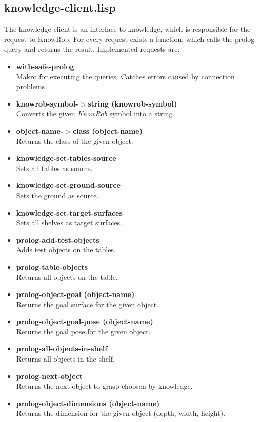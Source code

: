 \documentclass[main.tex]{subfiles}
\begin{document}
		\subsection{knowledge-client.lisp}
		The knowledge-client is an interface to knowledge, which is responsible for the request to KnowRob. For every request exists a function, which calls the prolog-query and returns the result. Implemented requests are:
			\begin{itemize}
			  \item \textbf{with-safe-prolog} \\
			  Makro for executing the queries. Catches errors caused by connection problems.
			  \item \textbf{knowrob-symbol-$>$string (knowrob-symbol)} \\
			  Converts the given \textit{KnowRob} symbol into a string.
			  \item \textbf{object-name-$>$class (object-name)} \\
			  Returns the class of the given object.
				\item \textbf{knowledge-set-tables-source} \\ Sets all tables as source.
				\item \textbf{knowledge-set-ground-source} \\ Sets the ground as source.
				\item \textbf{knowledge-set-target-surfaces} \\ Sets all shelves as target surfaces.
			  \item \textbf{prolog-add-test-objects} \\ Adds test objects on the tables.
				\item \textbf{prolog-table-objects} \\ Returns all objects on the table.
				\item \textbf{prolog-object-goal (object-name)} \\ Returns the goal surface for the given object.
			  \item \textbf{prolog-object-goal-pose (object-name)} \\ Returns the goal pose for the given object.
				\item \textbf{prolog-all-objects-in-shelf} \\ Returns all objects in the shelf.
				\item \textbf{prolog-next-object} \\ Returns the next object to grasp choosen by knowledge.
		    \item \textbf{prolog-object-dimensions (object-name)} \\ Returns the dimension for the given object (depth, width, height).

\end{itemize}
\end{document}
